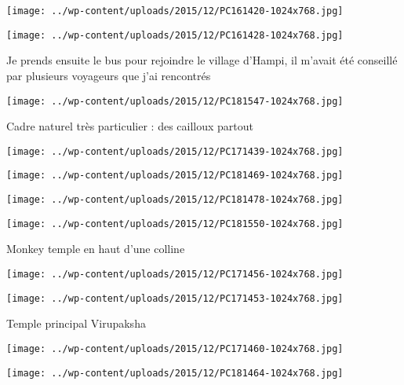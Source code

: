 \centerline{\texttt{[image: ../wp-content/uploads/2015/12/PC161420-1024x768.jpg]} } 
 \newline
 \newline
\centerline{\texttt{[image: ../wp-content/uploads/2015/12/PC161428-1024x768.jpg]} } 
 \newline
 Je prends ensuite le bus pour rejoindre le village d'Hampi, il m'avait été conseillé par plusieurs voyageurs que j'ai rencontrés \newline
 \newline
\centerline{\texttt{[image: ../wp-content/uploads/2015/12/PC181547-1024x768.jpg]} } 
 \newline
 Cadre naturel très particulier : des cailloux partout \newline
 \newline
\centerline{\texttt{[image: ../wp-content/uploads/2015/12/PC171439-1024x768.jpg]} } 
 \newline
 \newline
\centerline{\texttt{[image: ../wp-content/uploads/2015/12/PC181469-1024x768.jpg]} } 
 \newline
 \newline
\centerline{\texttt{[image: ../wp-content/uploads/2015/12/PC181478-1024x768.jpg]} } 
 \newline
 \newline
\centerline{\texttt{[image: ../wp-content/uploads/2015/12/PC181550-1024x768.jpg]} } 
 \newline
 Monkey temple en haut d'une colline \newline
 \newline
\centerline{\texttt{[image: ../wp-content/uploads/2015/12/PC171456-1024x768.jpg]} } 
 \newline
 \newline
\centerline{\texttt{[image: ../wp-content/uploads/2015/12/PC171453-1024x768.jpg]} } 
 \newline
 Temple principal Virupaksha \newline
 \newline
\centerline{\texttt{[image: ../wp-content/uploads/2015/12/PC171460-1024x768.jpg]} } 
 \newline
 \newline
\centerline{\texttt{[image: ../wp-content/uploads/2015/12/PC181464-1024x768.jpg]} } 
 \newline
